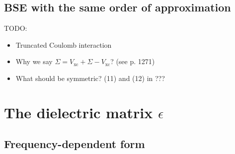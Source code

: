 \documentclass[hyperref, a4paper]{report}
\begin{document}
\subsection{BSE with the same order of approximation}



TODO: 
\begin{itemize}
    \item Truncated Coulomb interaction
    \item Why we say $\Sigma = V_{\text{xc}} + \Sigma - V_{\text{xc}}$?
    (see \cite{berkeleygw} p. 1271)
    \item What should be symmetric? (11) and (12) in \cite{berkeleygw}???
\end{itemize}

\section{The dielectric matrix $\epsilon$}\label{sec:gw-bse.overview-gw.epsilon}

\subsection{Frequency-dependent form}
\end{document}
